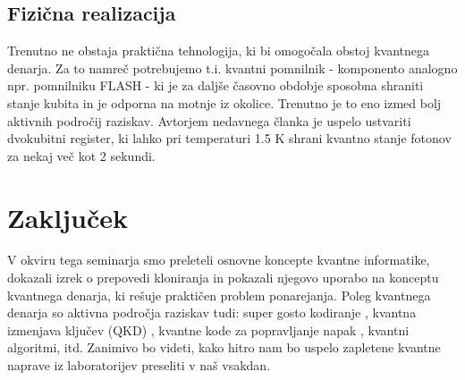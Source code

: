 \documentclass[12pt]{article}
\begin{document}
\subsection{Fizična realizacija}
Trenutno ne obstaja praktična tehnologija, ki bi omogočala obstoj kvantnega denarja. Za to namreč potrebujemo t.i. kvantni pomnilnik - komponento analogno npr. pomnilniku FLASH - ki je za daljše časovno obdobje sposobna shraniti stanje kubita in je odporna na motnje iz okolice. Trenutno je to eno izmed bolj aktivnih področij raziskav. Avtorjem nedavnega članka \cite{RobustMultiqubitQuantum} je uspelo ustvariti dvokubitni register, ki lahko pri temperaturi 1.5 $\text{K}$ shrani kvantno stanje fotonov za nekaj več kot 2 sekundi.  

\section{Zaključek}

V okviru tega seminarja smo preleteli osnovne koncepte kvantne informatike, dokazali izrek o prepovedi kloniranja in pokazali njegovo uporabo na konceptu kvantnega denarja, ki rešuje praktičen problem ponarejanja. Poleg kvantnega denarja so aktivna področja raziskav tudi: super gosto kodiranje \cite{SuperdenseCoding2023a}, kvantna izmenjava ključev (QKD) \cite{QuantumKeyDistribution2023a}, kvantne kode za popravljanje napak \cite{QuantumErrorCorrection2023}, kvantni algoritmi, itd. Zanimivo bo videti, kako hitro nam bo uspelo zapletene kvantne naprave iz laboratorijev preseliti v naš vsakdan.

\pagebreak
       
 \printbibliography[heading=bibintoc,title={Literatura}]
    
\end{document}
